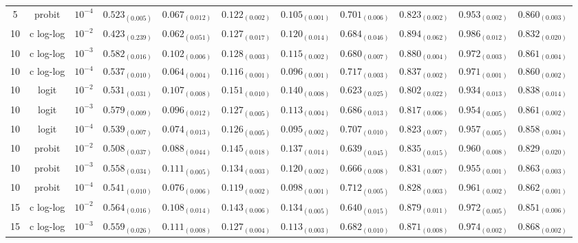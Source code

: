 \documentclass[journal]{IEEEtran}
\begin{document}
\begin{table*}[!t]
\begin{tabular}{c@{\hskip 0.15cm}c@{\hskip 0.15cm}c|c@{\hskip 0.30cm}c@{\hskip 0.20cm}c@{\hskip 0.20cm}c@{\hskip 0.20cm}c@{\hskip 0.20cm}c@{\hskip 0.20cm}c@{\hskip 0.20cm}c}
			5 & probit & $10^{-4}$ & $0.523_{(0.005)}$ & $0.067_{(0.012)}$ & $0.122_{(0.002)}$ & $0.105_{(0.001)}$ & $0.701_{(0.006)}$ & $0.823_{(0.002)}$ & $0.953_{(0.002)}$ & $0.860_{(0.003)}$\\
			10 & c log-log & $10^{-2}$ & $0.423_{(0.239)}$ & $0.062_{(0.051)}$ & $0.127_{(0.017)}$ & $0.120_{(0.014)}$ & $0.684_{(0.046)}$ & $\mathbf{0.894_{(0.062)}}$ & $\mathbf{0.986_{(0.012)}}$ & $0.832_{(0.020)}$\\
			10 & c log-log & $10^{-3}$ & $\mathbf{0.582_{(0.016)}}$ & $0.102_{(0.006)}$ & $0.128_{(0.003)}$ & $0.115_{(0.002)}$ & $0.680_{(0.007)}$ & $\mathit{0.880_{(0.004)}}$ & $0.972_{(0.003)}$ & $0.861_{(0.004)}$\\
			10 & c log-log & $10^{-4}$ & $0.537_{(0.010)}$ & $0.064_{(0.004)}$ & $\mathit{0.116_{(0.001)}}$ & $0.096_{(0.001)}$ & $0.717_{(0.003)}$ & $0.837_{(0.002)}$ & $0.971_{(0.001)}$ & $0.860_{(0.002)}$\\
			10 & logit & $10^{-2}$ & $0.531_{(0.031)}$ & $0.107_{(0.008)}$ & $0.151_{(0.010)}$ & $0.140_{(0.008)}$ & $0.623_{(0.025)}$ & $0.802_{(0.022)}$ & $0.934_{(0.013)}$ & $0.838_{(0.014)}$\\
			10 & logit & $10^{-3}$ & $0.579_{(0.009)}$ & $0.096_{(0.012)}$ & $0.127_{(0.005)}$ & $0.113_{(0.004)}$ & $0.686_{(0.013)}$ & $0.817_{(0.006)}$ & $0.954_{(0.005)}$ & $0.861_{(0.002)}$\\
			10 & logit & $10^{-4}$ & $0.539_{(0.007)}$ & $0.074_{(0.013)}$ & $0.126_{(0.005)}$ & $0.095_{(0.002)}$ & $0.707_{(0.010)}$ & $0.823_{(0.007)}$ & $0.957_{(0.005)}$ & $0.858_{(0.004)}$\\
			10 & probit & $10^{-2}$ & $0.508_{(0.037)}$ & $0.088_{(0.044)}$ & $0.145_{(0.018)}$ & $0.137_{(0.014)}$ & $0.639_{(0.045)}$ & $0.835_{(0.015)}$ & $0.960_{(0.008)}$ & $0.829_{(0.020)}$\\
			10 & probit & $10^{-3}$ & $0.558_{(0.034)}$ & $\mathbf{0.111_{(0.005)}}$ & $0.134_{(0.003)}$ & $0.120_{(0.002)}$ & $0.666_{(0.008)}$ & $0.831_{(0.007)}$ & $0.955_{(0.001)}$ & $0.863_{(0.003)}$\\
			10 & probit & $10^{-4}$ & $0.541_{(0.010)}$ & $0.076_{(0.006)}$ & $0.119_{(0.002)}$ & $0.098_{(0.001)}$ & $0.712_{(0.005)}$ & $0.828_{(0.003)}$ & $0.961_{(0.002)}$ & $0.862_{(0.001)}$\\
			15 & c log-log & $10^{-2}$ & $0.564_{(0.016)}$ & $0.108_{(0.014)}$ & $0.143_{(0.006)}$ & $0.134_{(0.005)}$ & $0.640_{(0.015)}$ & $0.879_{(0.011)}$ & $0.972_{(0.005)}$ & $0.851_{(0.006)}$\\
			15 & c log-log & $10^{-3}$ & $0.559_{(0.026)}$ & $\mathit{0.111_{(0.008)}}$ & $0.127_{(0.004)}$ & $0.113_{(0.003)}$ & $0.682_{(0.010)}$ & $0.871_{(0.008)}$ & $\mathit{0.974_{(0.002)}}$ & $\mathbf{0.868_{(0.002)}}$\\

\end{tabular}
\end{table*}
\end{document}
